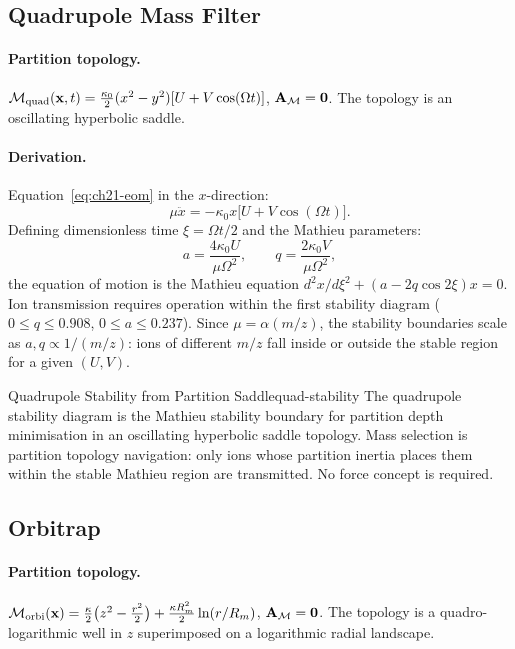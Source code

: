 \subsection{Quadrupole Mass Filter}

\paragraph{Partition topology.}
$\mathcal{M}_{\mathrm{quad}}(\mathbf{x},t) = \frac{\kappa_0}{2}(x^2-y^2)
[U + V\cos(\Omega t)]$, $\mathbf{A}_{\mathcal{M}} = \mathbf{0}$.  The topology is an
oscillating hyperbolic saddle.

\paragraph{Derivation.}
Equation~\eqref{eq:ch21-eom} in the $x$-direction:
\begin{equation}
  \mu\ddot{x} = -\kappa_0 x\bigl[U + V\cos(\Omega t)\bigr].
\end{equation}
Defining dimensionless time $\xi = \Omega t/2$ and the Mathieu parameters:
\begin{equation}\label{eq:ch21-mathieu}
  a = \frac{4\kappa_0 U}{\mu\Omega^2}, \qquad
  q = \frac{2\kappa_0 V}{\mu\Omega^2},
\end{equation}
the equation of motion is the Mathieu equation $d^2x/d\xi^2 + (a - 2q\cos
2\xi)x = 0$.  Ion transmission requires operation within the first stability
diagram ($0 \leq q \leq 0.908$, $0 \leq a \leq 0.237$).  Since $\mu =
\alpha(m/z)$, the stability boundaries scale as $a,q \propto 1/(m/z)$: ions
of different $m/z$ fall inside or outside the stable region for a given $(U,V)$.

\begin{consequence}{Quadrupole Stability from Partition Saddle}{quad-stability}
  The quadrupole stability diagram is the Mathieu stability boundary for
  partition depth minimisation in an oscillating hyperbolic saddle topology.
  Mass selection is partition topology navigation: only ions whose partition
  inertia places them within the stable Mathieu region are transmitted.
  No force concept is required.
\end{consequence}

\subsection{Orbitrap}

\paragraph{Partition topology.}
$\mathcal{M}_{\mathrm{orbi}}(\mathbf{x}) = \frac{\kappa}{2}\bigl(z^2 -
\tfrac{r^2}{2}\bigr) + \frac{\kappa R_m^2}{2}\ln(r/R_m)$, $\mathbf{A}_{\mathcal{M}} =
\mathbf{0}$.  The topology is a quadro-logarithmic well in $z$ superimposed
on a logarithmic radial landscape.

